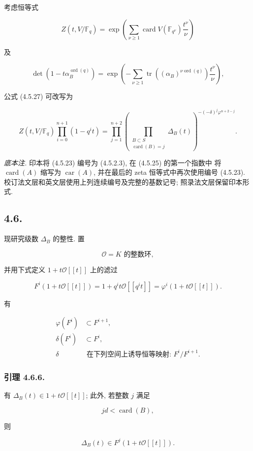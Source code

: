 考虑恒等式

\begin{equation}\tag{4.5.31}
Z(t,V/\mathbb F_q)
=\exp\!\left(
\sum_{\nu\geq1}
\operatorname{card}V(\mathbb F_{q^\nu})\frac{t^\nu}{\nu}
\right)
\end{equation}

及

\begin{equation}\tag{4.5.32}
\det\!\left(1-t\alpha_B^{\operatorname{ord}(q)}\right)
=\exp\!\left(
-\sum_{\nu\geq1}
\operatorname{tr}\!\left((\alpha_B)^{\nu\operatorname{ord}(q)}\right)
\frac{t^\nu}{\nu}
\right),
\end{equation}

公式 (4.5.27) 可改写为

\begin{equation}\tag{4.5.33}
Z(t,V/\mathbb F_q)\prod_{i=0}^{n+1}(1-q^it)
=\prod_{j=1}^{n+2}
\left(
\prod_{\substack{B\subset S\\\operatorname{card}(B)=j}}
\Delta_B(t)
\right)^{-(-\delta)^j\varphi^{n+2-j}}.
\end{equation}

\medskip
\noindent\emph{底本注.}
印本将 (4.5.23) 编号为 (4.5.2.3), 在 (4.5.25) 的第一个指数中
将 $\operatorname{card}(A)$ 缩写为 $\operatorname{car}(A)$,
并在最后的 zeta 恒等式中再次使用编号 (4.5.23).
校订法文层和英文层使用上列连续编号及完整的基数记号;
照录法文层保留印本形式.

\subsection*{4.6.}
现研究级数 $\Delta_B$ 的整性. 置

\begin{equation}\tag{4.6.1}
\mathcal O=\text{$K$ 的整数环},
\end{equation}

并用下式定义 $1+t\mathcal O[[t]]$ 上的滤过

\begin{equation}\tag{4.6.2}
F^i(1+t\mathcal O[[t]])
=1+q^it\mathcal O[[q^it]]
=\varphi^i(1+t\mathcal O[[t]]).
\end{equation}

有

\begin{align}
\varphi(F^i)&\subset F^{i+1}, \tag{4.6.3}\\
\delta(F^i)&\subset F^i, \tag{4.6.4}\\
\delta&\text{ 在下列空间上诱导恒等映射: }F^i/F^{i+1}. \tag{4.6.5}
\end{align}

\subsubsection*{引理 4.6.6.}
有 $\Delta_B(t)\in1+t\mathcal O[[t]]$; 此外, 若整数 $j$ 满足

\begin{equation}\tag{4.6.7}
jd<\operatorname{card}(B),
\end{equation}

则

\begin{equation}\tag{4.6.8}
\Delta_B(t)\in F^j(1+t\mathcal O[[t]]).
\end{equation}

